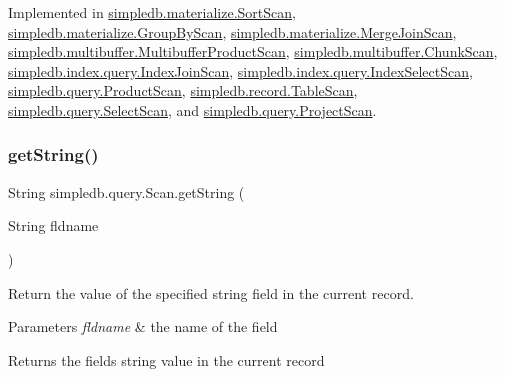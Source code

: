 Implemented in \hyperlink{classsimpledb_1_1materialize_1_1SortScan_a2a0cdce171742d1f7b29d15ba4413621}{simpledb.\+materialize.\+Sort\+Scan}, \hyperlink{classsimpledb_1_1materialize_1_1GroupByScan_a04e34f64ca9d51765f0d6ab05dc157bf}{simpledb.\+materialize.\+Group\+By\+Scan}, \hyperlink{classsimpledb_1_1materialize_1_1MergeJoinScan_aa1cf26813dd8eedf72edf094d257648f}{simpledb.\+materialize.\+Merge\+Join\+Scan}, \hyperlink{classsimpledb_1_1multibuffer_1_1MultibufferProductScan_ab41a5fafcf3d1af5b9657e83b1d734c2}{simpledb.\+multibuffer.\+Multibuffer\+Product\+Scan}, \hyperlink{classsimpledb_1_1multibuffer_1_1ChunkScan_a60fb6e3568149c5284b80e339d3e3ffb}{simpledb.\+multibuffer.\+Chunk\+Scan}, \hyperlink{classsimpledb_1_1index_1_1query_1_1IndexJoinScan_aa18e11532e9379d49fac3b9b3cd6f0a6}{simpledb.\+index.\+query.\+Index\+Join\+Scan}, \hyperlink{classsimpledb_1_1index_1_1query_1_1IndexSelectScan_aae5a05685f70eff1c67c9d4b47b84ba8}{simpledb.\+index.\+query.\+Index\+Select\+Scan}, \hyperlink{classsimpledb_1_1query_1_1ProductScan_a7b94328d04d2d0bf10f460d6abfc9299}{simpledb.\+query.\+Product\+Scan}, \hyperlink{classsimpledb_1_1record_1_1TableScan_abb08c41204e3130311ed1f264778b750}{simpledb.\+record.\+Table\+Scan}, \hyperlink{classsimpledb_1_1query_1_1SelectScan_af1af0f56c8c9afcc128cc2be6f4f4670}{simpledb.\+query.\+Select\+Scan}, and \hyperlink{classsimpledb_1_1query_1_1ProjectScan_a89039656c72ea917c18442e8f3627d14}{simpledb.\+query.\+Project\+Scan}.

\mbox{\label{interfacesimpledb_1_1query_1_1Scan_a922e219fee53ecfa6163525f9e3ef222}} 
\subsubsection{\texorpdfstring{get\+String()}{getString()}}
{\footnotesize\ttfamily String simpledb.\+query.\+Scan.\+get\+String (\begin{DoxyParamCaption}\item[{String}]{fldname }\end{DoxyParamCaption})}

Return the value of the specified string field in the current record. 
\begin{DoxyParams}{Parameters}
{\em fldname} & the name of the field \\
\hline
\end{DoxyParams}
\begin{DoxyReturn}{Returns}
the field\textquotesingle{}s string value in the current record 
\end{DoxyReturn}


